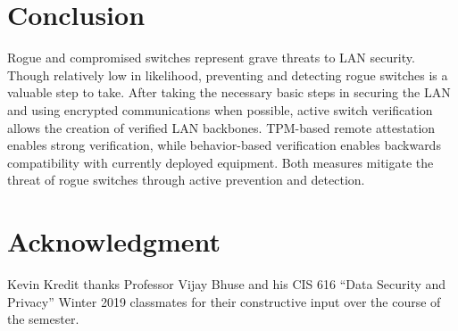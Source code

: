 \documentclass[journal]{IEEEtran}
\begin{document}
\section{Conclusion}
Rogue and compromised switches represent grave threats to LAN security. Though relatively low in
likelihood, preventing and detecting rogue switches is a valuable step to take. After taking the
necessary basic steps in securing the LAN and using encrypted communications when possible, active
switch verification allows the creation of verified LAN backbones. TPM-based remote attestation
enables strong verification, while behavior-based verification enables backwards compatibility with
currently deployed equipment. Both measures mitigate the threat of rogue switches through active
prevention and detection.







\section*{Acknowledgment}
Kevin Kredit thanks Professor Vijay Bhuse and his CIS 616 ``Data Security and Privacy'' Winter 2019
classmates for their constructive input over the course of the semester.
\end{document}
